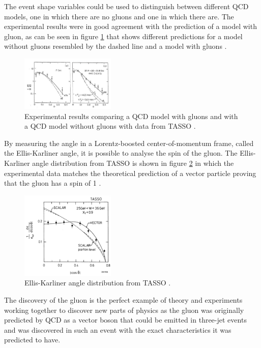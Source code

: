 The event shape variables could be used to distinguish between different QCD models, one in which there are no gluons and one in which there are.
The experimental results were in good agreement with the prediction of a model with gluon, as can be seen in figure \ref{fig:GluonResultsA} that shows different predictions for a model without gluons resembled by the dashed line and a model with gluons \cite{Branson:1994eu}.
\begin{figure}
    \centering
    \includegraphics[width=0.4\textwidth]{figs/gluonResultsA.png}
    \caption{Experimental results comparing a QCD model with gluons and with a QCD model without gluons with data from TASSO \cite{Branson:1994eu}.}
    \label{fig:GluonResultsA}
\end{figure}
By measuring the angle in a Lorentz-boosted center-of-momentum frame, called the Ellis-Karliner angle, it is possible to analyse the spin of the gluon.
The Ellis-Karliner angle distribution from TASSO is shown in figure \ref{fig:GluonResultsB} in which the experimental data matches the theoretical prediction of a vector particle proving that the gluon has a spin of 1 \cite{Venker, Soding:1996zk}.
\begin{figure}
    \centering
    \includegraphics[width=0.4\textwidth]{figs/gluonResultsB.png}
    \caption{Ellis-Karliner angle distribution from TASSO \cite{Venker, Soding:1996zk}.}
    \label{fig:GluonResultsB}
\end{figure}
The discovery of the gluon is the perfect example of theory and experiments working together to discover new parts of physics as the gluon was originally predicted by QCD as a vector boson that could be emitted in three-jet events and was discovered in such an event with the exact characteristics it was predicted to have.